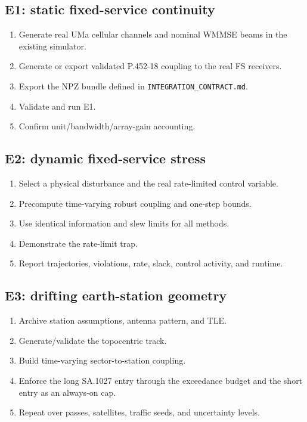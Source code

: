 \documentclass[11pt]{article}
\begin{document}
\subsection{E1: static fixed-service continuity}

\begin{enumerate}
\item Generate real UMa cellular channels and nominal WMMSE beams in the existing simulator.
\item Generate or export validated P.452-18 coupling to the real FS receivers.
\item Export the NPZ bundle defined in \texttt{INTEGRATION\_CONTRACT.md}.
\item Validate and run E1.
\item Confirm unit/bandwidth/array-gain accounting.
\end{enumerate}

\subsection{E2: dynamic fixed-service stress}

\begin{enumerate}
\item Select a physical disturbance and the real rate-limited control variable.
\item Precompute time-varying robust coupling and one-step bounds.
\item Use identical information and slew limits for all methods.
\item Demonstrate the rate-limit trap.
\item Report trajectories, violations, rate, slack, control activity, and runtime.
\end{enumerate}

\subsection{E3: drifting earth-station geometry}

\begin{enumerate}
\item Archive station assumptions, antenna pattern, and TLE.
\item Generate/validate the topocentric track.
\item Build time-varying sector-to-station coupling.
\item Enforce the long SA.1027 entry through the exceedance budget and the short entry as an always-on cap.
\item Repeat over passes, satellites, traffic seeds, and uncertainty levels.
\end{enumerate}
\end{document}
